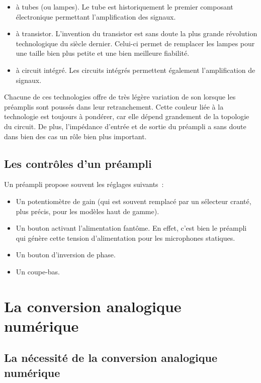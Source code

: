 \documentclass[
]{book}
\providecommand{\tightlist}{%
  \setlength{\itemsep}{0pt}\setlength{\parskip}{0pt}}
\begin{document}
\begin{itemize}
\tightlist
\item
  à tubes (ou lampes). Le tube est historiquement le premier composant électronique permettant l'amplification des signaux.
\item
  à transistor. L'invention du transistor est sans doute la plus grande révolution technologique du siècle dernier. Celui-ci permet de remplacer les lampes pour une taille bien plus petite et une bien meilleure fiabilité.
\item
  à circuit intégré. Les circuits intégrés permettent également l'amplification de signaux.
\end{itemize}

Chacune de ces technologies offre de très légère variation de son lorsque les préamplis sont poussés dans leur retranchement. Cette couleur liée à la technologie est toujours à pondérer, car elle dépend grandement de la topologie du circuit. De plus, l'impédance d'entrée et de sortie du préampli a sans doute dans bien des cas un rôle bien plus important.

\hypertarget{les-contruxf4les-dun-pruxe9ampli}{%
\section{Les contrôles d'un préampli}\label{les-contruxf4les-dun-pruxe9ampli}}

Un préampli propose souvent les réglages suivants~:

\begin{itemize}
\tightlist
\item
  Un potentiomètre de gain (qui est souvent remplacé par un sélecteur cranté, plus précis, pour les modèles haut de gamme).
\item
  Un bouton activant l'alimentation fantôme. En effet, c'est bien le préampli qui génère cette tension d'alimentation pour les microphones statiques.
\item
  Un bouton d'inversion de phase.
\item
  Un coupe-bas.
\end{itemize}

\hypertarget{la-conversion-analogique-numuxe9rique}{%
\chapter{La conversion analogique numérique}\label{la-conversion-analogique-numuxe9rique}}

\hypertarget{la-nuxe9cessituxe9-de-la-conversion-analogique-numuxe9rique}{%
\section{La nécessité de la conversion analogique numérique}\label{la-nuxe9cessituxe9-de-la-conversion-analogique-numuxe9rique}}
\end{document}
